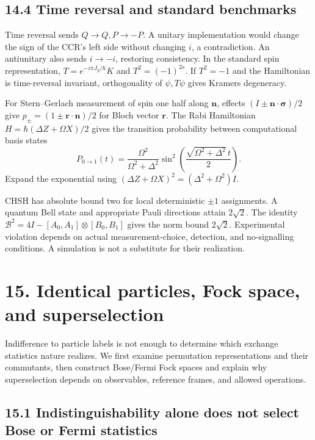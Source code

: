 \documentclass[
  11pt,
  oneside]{book}
\begin{document}
\section{14.4 Time reversal and standard benchmarks}

Time reversal sends \(Q\to Q,P\to-P\). A unitary implementation would
change the sign of the CCR's left side without changing \(i\), a
contradiction. An antiunitary also sends \(i\to-i\), restoring
consistency. In the standard spin representation,
\(T=e^{-i\pi J_y/\hbar}K\) and \(T^2=(-1)^{2s}\). If \(T^2=-1\) and the
Hamiltonian is time-reversal invariant, orthogonality of \(\psi,T\psi\)
gives Kramers degeneracy.

For Stern--Gerlach measurement of spin one half along \(\mathbf n\),
effects \((I\pm\mathbf n\cdot\boldsymbol\sigma)/2\) give
\(p_\pm=(1\pm\mathbf r\cdot\mathbf n)/2\) for Bloch vector
\(\mathbf r\). The Rabi Hamiltonian \(H=\hbar(\Delta Z+\Omega X)/2\)
gives the transition probability between computational basis states \[
P_{0\to1}(t)=\frac{\Omega^2}{\Omega^2+\Delta^2}
\sin^2\left(\frac{\sqrt{\Omega^2+\Delta^2}\,t}{2}\right).
\] Expand the exponential using
\((\Delta Z+\Omega X)^2=(\Delta^2+\Omega^2)I\).

CHSH has absolute bound two for local deterministic \(\pm1\)
assignments. A quantum Bell state and appropriate Pauli directions
attain \(2\sqrt2\). The identity
\(\mathcal B^2=4I-[A_0,A_1]\otimes[B_0,B_1]\) gives the norm bound
\(2\sqrt2\). Experimental violation depends on actual
measurement-choice, detection, and no-signalling conditions. A
simulation is not a substitute for their realization.

\chapter{15. Identical particles, Fock space, and
superselection}\label{ch-15}

Indifference to particle labels is not enough to determine which
exchange statistics nature realizes. We first examine permutation
representations and their commutants, then construct Bose/Fermi Fock
spaces and explain why superselection depends on observables, reference
frames, and allowed operations.

\section{15.1 Indistinguishability alone does not select Bose or Fermi
statistics}
\end{document}
